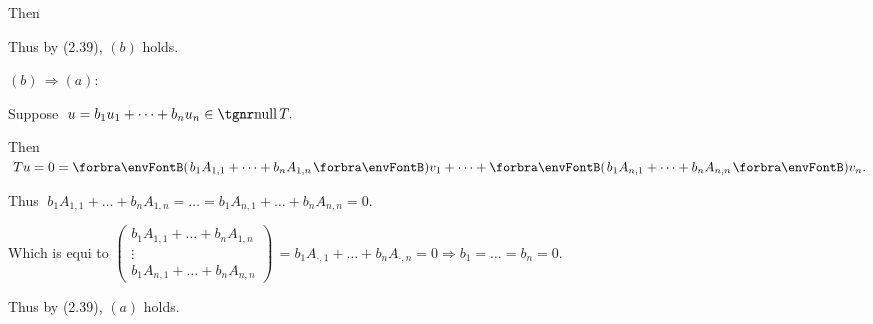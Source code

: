 Then \vspace{-7.2pt}\par\quad\Ha
Thus by (2.39), $(b)$ holds.\vspace{10pt}\par\quad
$(b)\,\Rightarrow(a):\;$\par\quad\Hb
Suppose $\;u=b_1u_1+\dots+b_nu_n\in\null T.$\par\quad\Hb
Then $\;Tu=0=\Par{b_1A_{1,1}+\dots+b_nA_{1,n}}v_1+\dots+\Par{b_1A_{n,1}+\dots+b_nA_{n,n}}v_n.$\par\quad\Hb
Thus $\;b_1A_{1,1}+\dots+b_nA_{1,n}=\dots=b_1A_{n,1}+\dots+b_nA_{n,n}=0.$\vspace{6pt}\par\quad\Hb
Which is equi to {\;\normalsize$
	\begin{pmatrix}
		b_1 A_{1,1}+\dots+b_nA_{1,n}\\
		\vdots\\
		b_1 A_{n,1}+\dots+b_nA_{n,n}
	\end{pmatrix}$}$\,=b_1A_{\cdot,1}+\dots+b_nA_{\cdot,n}=0\Rightarrow b_1=\dots=b_n=0.$\vspace{6pt}\par\quad\Hb
Thus by (2.39), $(a)$ holds.\PfEnd
\SepLine
\pagebreak

